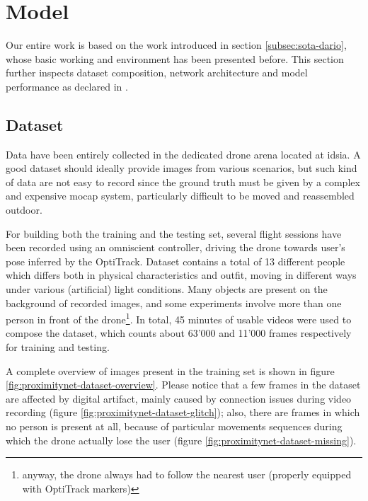 \section{Model}
\label{sec:proximitynet}

Our entire work is based on the work introduced in section \ref{subsec:sota-dario}, whose basic working and environment has been presented before. This section further inspects dataset composition, network architecture and model performance as declared in \cite{mantegazza2019visionbased}.



\subsection{Dataset}
\label{subsec:proximitynet-dataset}

Data have been entirely collected in the dedicated drone arena located at \gls{idsia}. A good dataset should ideally provide images from various scenarios, but such kind of data are not easy to record since the ground truth must be given by a complex and expensive \gls{mocap} system, particularly difficult to be moved and reassembled outdoor.

For building both the training and the testing set, several flight sessions have been recorded using an omniscient controller, driving the drone towards user's pose inferred by the OptiTrack. Dataset contains a total of 13 different people which differs both in physical characteristics and outfit, moving in different ways under various (artificial) light conditions. Many objects are present on the background of recorded images, and some experiments involve more than one person in front of the drone\footnote{anyway, the drone always had to follow the nearest user (properly equipped with OptiTrack markers)}. In total, 45 minutes of usable videos were used to compose the dataset, which counts about 63'000 and 11'000 frames respectively for training and testing.

A complete overview of images present in the training set is shown in figure \ref{fig:proximitynet-dataset-overview}. Please notice that a few frames in the dataset are affected by digital artifact, mainly caused by connection issues during video recording (figure \ref{fig:proximitynet-dataset-glitch}); also, there are frames in which no person is present at all, because of particular movements sequences during which the drone actually lose the user (figure \ref{fig:proximitynet-dataset-missing}).

